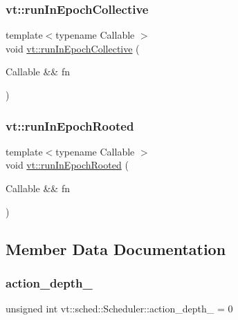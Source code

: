\subsubsection{\texorpdfstring{vt\+::run\+In\+Epoch\+Collective}{vt::runInEpochCollective}}
{\footnotesize\ttfamily template$<$typename Callable $>$ \\
void \hyperlink{namespacevt_a2fc4ef34f30b49a1781d765804bfadbb}{vt\+::run\+In\+Epoch\+Collective} (\begin{DoxyParamCaption}\item[{Callable \&\&}]{fn }\end{DoxyParamCaption})\hspace{0.3cm}{\ttfamily [friend]}}

\mbox{\label{structvt_1_1sched_1_1_scheduler_a792343e9a39ba8661b35c3c9e55f3541}} 
\subsubsection{\texorpdfstring{vt\+::run\+In\+Epoch\+Rooted}{vt::runInEpochRooted}}
{\footnotesize\ttfamily template$<$typename Callable $>$ \\
void \hyperlink{namespacevt_a9f5cbbc484d7f14f2ad0ee46d62dfb6e}{vt\+::run\+In\+Epoch\+Rooted} (\begin{DoxyParamCaption}\item[{Callable \&\&}]{fn }\end{DoxyParamCaption})\hspace{0.3cm}{\ttfamily [friend]}}



\subsection{Member Data Documentation}
\mbox{\label{structvt_1_1sched_1_1_scheduler_a2cd57a3a421320e22d3ee8a6d47eb19e}} 
\subsubsection{\texorpdfstring{action\+\_\+depth\+\_\+}{action\_depth\_}}
{\footnotesize\ttfamily unsigned int vt\+::sched\+::\+Scheduler\+::action\+\_\+depth\+\_\+ = 0\hspace{0.3cm}{\ttfamily [private]}}

